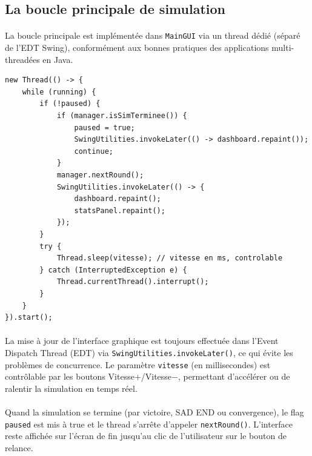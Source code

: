 \bigskip

\subsection{La boucle principale de simulation}

\paragraph{} La boucle principale est implémentée dans \texttt{MainGUI} via un thread dédié (séparé de l'EDT Swing), conformément aux bonnes pratiques des applications multi-threadées en Java.

\begin{lstlisting}[caption={Boucle principale dans MainGUI (thread dédié)}]
new Thread(() -> {
    while (running) {
        if (!paused) {
            if (manager.isSimTerminee()) {
                paused = true;
                SwingUtilities.invokeLater(() -> dashboard.repaint());
                continue;
            }
            manager.nextRound();
            SwingUtilities.invokeLater(() -> {
                dashboard.repaint();
                statsPanel.repaint();
            });
        }
        try {
            Thread.sleep(vitesse); // vitesse en ms, controlable
        } catch (InterruptedException e) {
            Thread.currentThread().interrupt();
        }
    }
}).start();
\end{lstlisting}

\paragraph{} La mise à jour de l'interface graphique est toujours effectuée dans l'Event Dispatch Thread (EDT) via \texttt{SwingUtilities.invokeLater()}, ce qui évite les problèmes de concurrence. Le paramètre \texttt{vitesse} (en millisecondes) est contrôlable par les boutons Vitesse+/Vitesse$-$, permettant d'accélérer ou de ralentir la simulation en temps réel.

\paragraph{} Quand la simulation se termine (par victoire, SAD END ou convergence), le flag \texttt{paused} est mis à true et le thread s'arrête d'appeler \texttt{nextRound()}. L'interface reste affichée sur l'écran de fin jusqu'au clic de l'utilisateur sur le bouton de relance.

\bigskip

